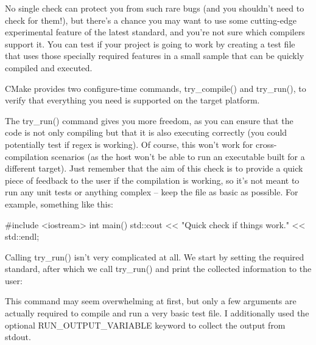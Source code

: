 No single check can protect you from such rare bugs (and you shouldn’t need to check for them!), but there’s a chance you may want to use some cutting-edge experimental feature of the latest standard, and you’re not sure which compilers support it. You can test if your project is going to work by creating a test file that uses those specially required features in a small sample that can be quickly compiled and executed.

CMake provides two configure-time commands, try\_compile() and try\_run(), to verify that everything you need is supported on the target platform.

The try\_run() command gives you more freedom, as you can ensure that the code is not only compiling but that it is also executing correctly (you could potentially test if regex is working). Of course, this won’t work for cross-compilation scenarios (as the host won’t be able to run an executable built for a different target). Just remember that the aim of this check is to provide a quick piece of feedback to the user if the compilation is working, so it’s not meant to run any unit tests or anything complex – keep the file as basic as possible. For example, something like this:


\begin{cpp}
#include <iostream>
int main()
{
    std::cout << "Quick check if things work." << std::endl;
}
\end{cpp}

Calling try\_run() isn’t very complicated at all. We start by setting the required standard, after which we call try\_run() and print the collected information to the user:



This command may seem overwhelming at first, but only a few arguments are actually required to compile and run a very basic test file. I additionally used the optional RUN\_OUTPUT\_VARIABLE keyword to collect the output from stdout.

